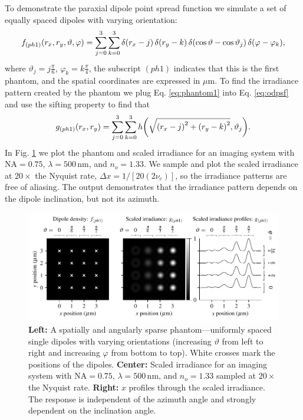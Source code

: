 \documentclass[]{osa-article}
\let\originalleft\left
\let\originalright\right
\renewcommand{\left}{\mathopen{}\mathclose\bgroup\originalleft}
\renewcommand{\right}{\aftergroup\egroup\originalright}
\begin{document}
 To demonstrate the paraxial dipole point spread function we simulate a set of
 equally spaced dipoles with varying orientation:
 \begin{align}
   f_{(ph1)}(r_x, r_y, \vartheta, \varphi) = \sum_{j=0}^3 \sum_{k=0}^3 \delta\left(r_x - j\right)\, \delta\left(r_y - k\right)\, \delta\left(\cos\vartheta - \cos\vartheta_j\right)\, \delta\left(\varphi - \varphi_k\right),\label{eq:phantom1}
 \end{align}
 where $\vartheta_j = j\frac{\pi}{6}$, $\varphi_k = k\frac{\pi}{4}$, the
 subscript $(ph1)$ indicates that this is the first phantom, and the spatial
 coordinates are expressed in $\mu$m. To find the irradiance pattern created by
 the phantom we plug Eq. \eqref{eq:phantom1} into Eq. \eqref{eq:odpsf} and use
 the sifting property to find that
 \begin{align}
   g_{(ph1)}(r_x, r_y) = \sum_{j=0}^3 \sum_{k=0}^3 h\left(\sqrt{\left(r_x - j\right)^2 + \left(r_y - k\right)^2}, \vartheta_j\right).\label{eq:phantom1irr}
 \end{align}
 In Fig. \ref{fig:ph1} we plot the phantom and scaled irradiance for an imaging
 system with $\text{NA} = 0.75$, $\lambda = 500\,\text{nm}$, and $n_o = 1.33$.
 We sample and plot the scaled irradiance at $20\times$ the Nyquist rate,
 $\Delta x = 1/[20(2\nu_c)]$, so the irradiance patterns are free of aliasing.
 The output demonstrates that the irradiance pattern depends on the dipole
 inclination, but not its azimuth.

 \begin{figure}[h]
 \centering
   \centering
   \includegraphics[scale=0.8]{../figures/paratfs/ph1.pdf}
   \caption{\textbf{Left:} A spatially and angularly sparse phantom---uniformly
     spaced single dipoles with varying orientations (increasing $\vartheta$
     from left to right and increasing $\varphi$ from bottom to top). White
     crosses mark the positions of the dipoles. \textbf{Center:} Scaled
     irradiance for an imaging system with $\text{NA} = 0.75$,
     $\lambda = 500\,\text{nm}$, and $n_o = 1.33$ sampled at $20\times$ the
     Nyquist rate. \textbf{Right:} $x$ profiles through the scaled irradiance.
     The response is independent of the azimuth angle and strongly dependent on
     the inclination angle.}
   \label{fig:ph1}
 \end{figure}
\end{document}
